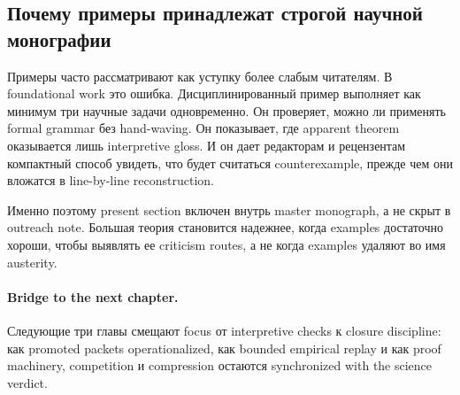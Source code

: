 \subsection{Почему примеры принадлежат строгой научной монографии}

Примеры часто рассматривают как уступку более слабым читателям. В
foundational work это ошибка. Дисциплинированный пример выполняет как
минимум три научные задачи одновременно. Он проверяет, можно ли применять
formal grammar без hand-waving. Он показывает, где apparent theorem
оказывается лишь interpretive gloss. И он дает редакторам и рецензентам
компактный способ увидеть, что будет считаться counterexample, прежде чем
они вложатся в line-by-line reconstruction.

Именно поэтому present section включен внутрь master monograph, а не скрыт в
outreach note. Большая теория становится надежнее, когда examples достаточно
хороши, чтобы выявлять ее criticism routes, а не когда examples удаляют во имя
austerity.

\paragraph{Bridge to the next chapter.}
Следующие три главы смещают focus от interpretive checks к closure discipline:
как promoted packets operationalized, как bounded empirical replay и как proof
machinery, competition и compression остаются synchronized with the science
verdict.

\clearpage

